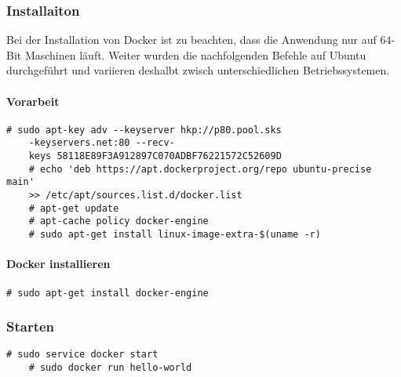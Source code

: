 \subsubsection{Installaiton}
Bei der Installation von Docker ist zu beachten, dass die Anwendung nur auf 64-Bit Maschinen läuft. Weiter wurden die nachfolgenden Befehle auf Ubuntu durchgeführt und variieren deshalbt zwisch unterschiedlichen Betriebssystemen. 

\paragraph{Vorarbeit}
\begin{lstlisting}[style=BashInputStyle]
	# sudo apt-key adv --keyserver hkp://p80.pool.sks
	-keyservers.net:80 --recv-		
	keys 58118E89F3A912897C070ADBF76221572C52609D
	# echo 'deb https://apt.dockerproject.org/repo ubuntu-precise main' 
	>> /etc/apt/sources.list.d/docker.list
	# apt-get update
	# apt-cache policy docker-engine
	# sudo apt-get install linux-image-extra-$(uname -r)
\end{lstlisting}
\paragraph{Docker installieren}
\begin{lstlisting}[style=BashInputStyle]
	# sudo apt-get install docker-engine
\end{lstlisting}

\subsubsection{Starten}
\begin{lstlisting}[style=BashInputStyle]
	# sudo service docker start
	# sudo docker run hello-world
\end{lstlisting}


